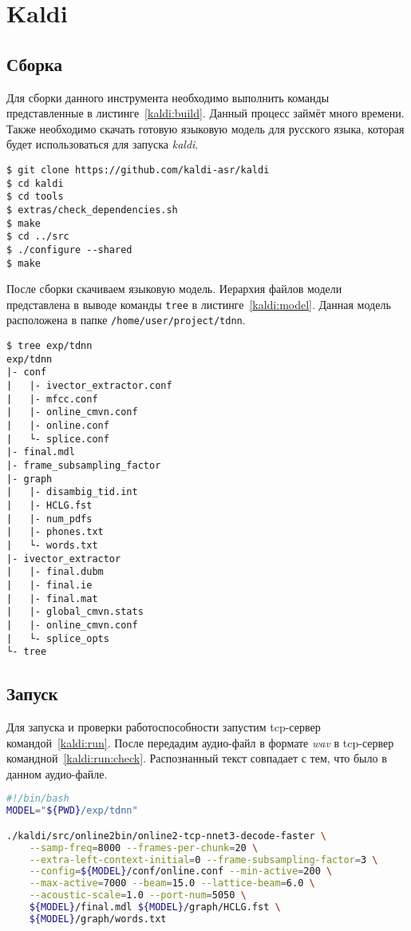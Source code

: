 \section{Kaldi}
\subsection{Сборка}
Для сборки данного инструмента необходимо выполнить команды
представленные в листинге~\ref{kaldi:build}. Данный процесс займёт много времени.
Также необходимо скачать готовую языковую модель для русского языка, которая
будет использоваться для запуска \textit{kaldi}.

\begin{lstlisting}[caption={Сборка Kaldi}, label=kaldi:build]
$ git clone https://github.com/kaldi-asr/kaldi
$ cd kaldi
$ cd tools
$ extras/check_dependencies.sh
$ make
$ cd ../src
$ ./configure --shared
$ make
\end{lstlisting}

После сборки скачиваем языковую модель. Иерархия файлов модели представлена
в выводе команды \texttt{tree} в листинге~\ref{kaldi:model}. Данная модель
расположена в папке \texttt{/home/user/project/tdnn}.

\begin{minipage}{\textwidth}

\begin{lstlisting}[caption={Структура языковой модели}, label={kaldi:model}]
$ tree exp/tdnn
exp/tdnn
|- conf
|   |- ivector_extractor.conf
|   |- mfcc.conf
|   |- online_cmvn.conf
|   |- online.conf
|   └- splice.conf
|- final.mdl
|- frame_subsampling_factor
|- graph
|   |- disambig_tid.int
|   |- HCLG.fst
|   |- num_pdfs
|   |- phones.txt
|   └- words.txt
|- ivector_extractor
|   |- final.dubm
|   |- final.ie
|   |- final.mat
|   |- global_cmvn.stats
|   |- online_cmvn.conf
|   └- splice_opts
└- tree
\end{lstlisting}
\end{minipage}

\subsection{Запуск}
Для запуска и проверки работоспособности запустим tcp-сервер командой~\ref{kaldi:run}.
После передадим аудио-файл в формате \textit{wav} в tcp-сервер командной~\ref{kaldi:run:check}.
\linebreak Распознанный текст совпадает с тем, что было в данном аудио-файле.

\begin{lstlisting}[caption={Запуск tcp-сервера},label={kaldi:run},language=bash]
#!/bin/bash
MODEL="${PWD}/exp/tdnn"

./kaldi/src/online2bin/online2-tcp-nnet3-decode-faster \
    --samp-freq=8000 --frames-per-chunk=20 \
    --extra-left-context-initial=0 --frame-subsampling-factor=3 \
    --config=${MODEL}/conf/online.conf --min-active=200 \
    --max-active=7000 --beam=15.0 --lattice-beam=6.0 \
    --acoustic-scale=1.0 --port-num=5050 \
    ${MODEL}/final.mdl ${MODEL}/graph/HCLG.fst \
    ${MODEL}/graph/words.txt
\end{lstlisting}

